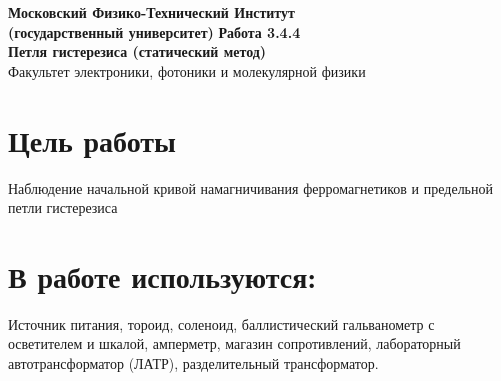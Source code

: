 \documentclass[11pt]{article}
\begin{document}
\begin{titlepage}
\begin{center}
\large\textbf{Московский Физико-Технический Институт}\\
\large\textbf{(государственный университет)}
\vfill
\huge\textbf{ Работа 3.4.4}\\
\huge\textbf{Петля гистерезиса (статический метод)}\\
\vfill
\large Факультет электроники, фотоники и молекулярной физики\\
\end{center}
\end{titlepage}
\tableofcontents
\newpage
\section{Цель работы}
Наблюдение начальной кривой намагничивания ферромагнетиков и предельной петли гистерезиса
\section{В работе используются:}
Источник питания, тороид, соленоид, баллистический гальванометр с осветителем и шкалой, амперметр, магазин сопротивлений, лабораторный автотрансформатор (ЛАТР), разделительный трансформатор.
\end{document}
